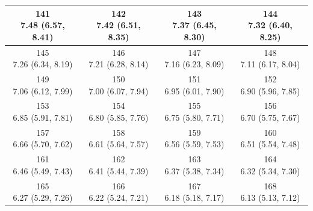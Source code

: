\begin{table}[htbp]
\begin{tabular}{cccc}
\hline
\shortstack[c]{141\\7.48 (6.57, 8.41)} & \shortstack[c]{142\\7.42 (6.51, 8.35)} & \shortstack[c]{143\\7.37 (6.45, 8.30)} & \shortstack[c]{144\\7.32 (6.40, 8.25)} \\
\hline
\shortstack[c]{145\\7.26 (6.34, 8.19)} & \shortstack[c]{146\\7.21 (6.28, 8.14)} & \shortstack[c]{147\\7.16 (6.23, 8.09)} & \shortstack[c]{148\\7.11 (6.17, 8.04)} \\
\hline
\shortstack[c]{149\\7.06 (6.12, 7.99)} & \shortstack[c]{150\\7.00 (6.07, 7.94)} & \shortstack[c]{151\\6.95 (6.01, 7.90)} & \shortstack[c]{152\\6.90 (5.96, 7.85)} \\
\hline
\shortstack[c]{153\\6.85 (5.91, 7.81)} & \shortstack[c]{154\\6.80 (5.85, 7.76)} & \shortstack[c]{155\\6.75 (5.80, 7.71)} & \shortstack[c]{156\\6.70 (5.75, 7.67)} \\
\hline
\shortstack[c]{157\\6.66 (5.70, 7.62)} & \shortstack[c]{158\\6.61 (5.64, 7.57)} & \shortstack[c]{159\\6.56 (5.59, 7.53)} & \shortstack[c]{160\\6.51 (5.54, 7.48)} \\
\hline
\shortstack[c]{161\\6.46 (5.49, 7.43)} & \shortstack[c]{162\\6.41 (5.44, 7.39)} & \shortstack[c]{163\\6.37 (5.38, 7.34)} & \shortstack[c]{164\\6.32 (5.34, 7.30)} \\
\hline
\shortstack[c]{165\\6.27 (5.29, 7.26)} & \shortstack[c]{166\\6.22 (5.24, 7.21)} & \shortstack[c]{167\\6.18 (5.18, 7.17)} & \shortstack[c]{168\\6.13 (5.13, 7.12)} \\

\end{tabular}
\end{table}
